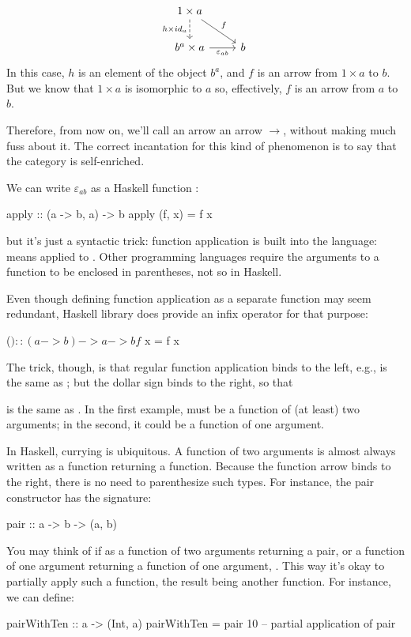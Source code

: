 \documentclass[DaoFP]{subfiles}
\begin{document}
\[
 \begin{tikzcd}
 1 \times a
 \arrow[d, dashed, "h \times id_a"']
 \arrow[rd, "f"]
 \\
 b^a \times a
 \arrow[r, "\varepsilon_{a b}"']
& b
 \end{tikzcd}
\]
In this case, $h$ is an element of the object $b^a$, and $f$ is an arrow from $1 \times a$ to $b$. But we know that $1 \times a$ is isomorphic to $a$ so, effectively, $f$ is an arrow from $a$ to $b$. 

Therefore, from now on, we'll call an arrow \hask{->} an arrow $\to$, without making much fuss about it. The correct incantation for this kind of phenomenon is to say that the category is self-enriched.

We can write $\varepsilon_{a b}$ as a Haskell function :
\begin{haskell}
apply :: (a -> b, a) -> b
apply (f, x) = f x
\end{haskell}
but it's just a syntactic trick: function application is built into the language:  means  applied to . Other programming languages require the arguments to a function to be enclosed in parentheses, not so in Haskell. 

Even though defining function application as a separate function may seem redundant, Haskell library does provide an infix operator \hask{$} for that purpose:
\begin{haskell}
($) :: (a -> b) -> a -> b
f $ x = f x
\end{haskell}
The trick, though, is that regular function application binds to the left, e.g.,  is the same as ; but the dollar sign binds to the right, so that 
is the same as . In the first example,  must be a function of (at least) two arguments; in the second, it could be a function of one argument.

In Haskell, currying is ubiquitous. A function of two arguments is almost always written as a function returning a function. Because the function arrow \hask{->} binds to the right, there is no need to parenthesize such types. For instance, the pair constructor has the signature:
\begin{haskell}
pair :: a -> b -> (a, b)
\end{haskell}
You may think of if as a function of two arguments returning a pair, or a function of one argument returning a function of one argument, . This way it's okay to partially apply such a function, the result being another function. For instance, we can define:
\begin{haskell}
pairWithTen :: a -> (Int, a)
pairWithTen = pair 10 -- partial application of pair
\end{haskell}
\end{document}
